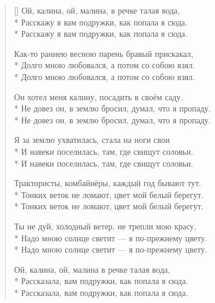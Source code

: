\documentclass[a4paper,oneside,14pt]{scrbook}
\begin{document}
    \settowidth{\versewidth}{Ой калина, ой малина, в речке талая вода,}
    \begin{verse}[\versewidth]
        Ой, калина, ой, малина, в речке талая вода,\\*
        Расскажу я вам подружки, как попала я сюда.\\*
        \vin Расскажу я вам подружки, как попала я сюда.
        
        Как-то раннею весною парень бравый прискакал,\\*
        Долго мною любовался, а потом со собою взял.\\*
        \vin Долго мною любовался, а потом со собою взял.

        Он хотел меня калину, посадить в своём саду.\\*
        Не довез он, в землю бросил, думал, что я пропаду.\\*
        \vin Не довез он, в землю бросил, думал, что я пропаду.

        Я за землю ухватилась, стала на ноги свои\\*
        И навеки поселилась, там, где свищут соловьи.\\*
        \vin И навеки поселилась, там, где свищут соловьи.

        Трактористы, комбайнёры, каждый год бывают тут.\\*
        Тонких веток не ломают, цвет мой белый берегут.\\*
        \vin Тонких веток не ломают, цвет мой белый берегут.

        Ты не дуй, холодный ветер, не трепли мою красу,\\*
        Надо мною солнце светит --- я по-прежнему цвету.\\*
        \vin Надо мною солнце светит --- я по-прежнему цвету.

        Ой, калина, ой, малина в речке талая вода,\\*
        Рассказала, вам подружки, как попала я сюда.\\*
        \vin Рассказала, вам подружки, как попала я сюда.
    \end{verse}
\end{document}
